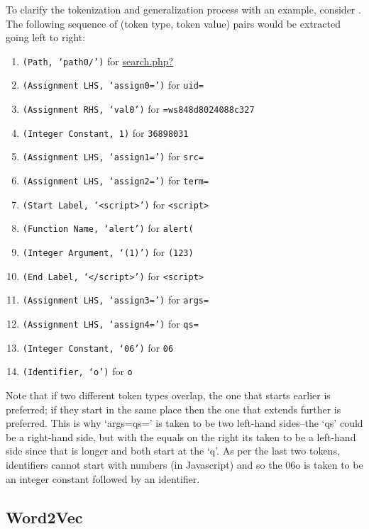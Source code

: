 To clarify the tokenization and generalization process with an example, consider . The following sequence of (token type, token value) pairs would be extracted going left to right:

\begin{enumerate}
\item \texttt{(Path, `path0/')} for \url{search.php?}
\item \texttt{(Assignment LHS, `assign0=')} for \texttt{uid=}
\item \texttt{(Assignment RHS, `val0')} for \texttt{=ws848d8024088c327}
\item \texttt{(Integer Constant, 1)} for \texttt{36898031}
\item \texttt{(Assignment LHS, `assign1=')} for \texttt{src=}
\item \texttt{(Assignment LHS, `assign2=')} for \texttt{term=}
\item \texttt{(Start Label, `<script>')} for \texttt{<script>}
\item \texttt{(Function Name, `alert')} for \texttt{alert(}
\item \texttt{(Integer Argument, `(1)')} for \texttt{(123)}
\item \texttt{(End Label, `</script>')} for \texttt{<script>}
\item \texttt{(Assignment LHS, `assign3=')} for \texttt{args=}
\item \texttt{(Assignment LHS, `assign4=')} for \texttt{qs=}
\item \texttt{(Integer Constant, `06')} for \texttt{06}
\item \texttt{(Identifier, `o')} for \texttt{o}
\end{enumerate}

Note that if two different token types overlap, the one that starts earlier is preferred; if they start in the same place then the one that extends further is preferred. This is why `args=qs=' is taken to be two left-hand sides--the `qs' could be a right-hand side, but with the equals on the right its taken to be a left-hand side since that is longer and both start at the `q'. As per the last two tokens, identifiers cannot start with numbers  (in Javascript) and so the 06o is taken to be an integer constant followed by an identifier.


\subsection{Word2Vec}

